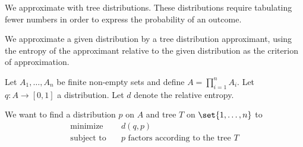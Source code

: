 

We approximate with tree distributions.
These distributions require tabulating fewer numbers in order to express the probability of an outcome.


We approximate a given distribution by a tree distribution approximant, using the entropy of the approximant relative to the given distribution as the criterion of approximation.


Let $A_1, \dots, A_n$ be finite non-empty sets and define $A = \prod_{i = 1}^{n} A_i$.
Let $q: A \to [0, 1]$ a distribution.
Let $d$ denote the relative
entropy.

We want to find a distribution $p$ on $A$ and tree $T$ on $\set{1, \dots, n}$ to
\[
  \begin{aligned}
    \text{minimize}   &\quad d(q, p) \\
    \text{subject to} &\quad p \text{ factors according to the tree } T
  \end{aligned}
\]

